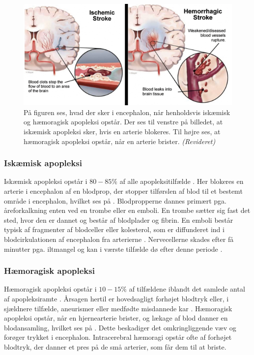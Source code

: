 \begin{figure}[H]
	\centering
	\includegraphics[scale=0.8]{figures/bProblemanalyse/haemoragisk_og_iskaemisk.png}
	\caption{På figuren ses, hvad der sker i encephalon, når henholdsvis iskæmisk og hæmoragisk apopleksi opstår. Der ses til venstre på billedet, at iskæmisk apopleksi sker, hvis en arterie blokeres. Til højre ses, at hæmoragisk apopleksi opstår, når en arterie brister. \textit{(Revideret)} \cite{Ritter2015}}
	\label{haem-isk}
\end{figure}

\subsubsection{Iskæmisk apopleksi}\label{IskaemiskApp}
Iskæmisk apopleksi opstår i $80-85\%$ af alle apopleksitilfælde \cite{Sundhed.dk2014}. Her blokeres en arterie i encephalon af en blodprop, der stopper tilførslen af blod til et bestemt område i encephalon, hvilket ses på . Blodpropperne dannes primært pga. åreforkalkning enten ved en trombe eller en emboli. En trombe sætter sig fast det sted, hvor den er dannet og består af blodplader og fibrin. \cite{Schulze2011} En emboli består typisk af fragmenter af blodceller eller kolesterol, som er diffunderet ind i blodcirkulationen af encephalon fra arterierne \cite{Academic2015a}. Nervecellerne skades efter få minutter pga. iltmangel og kan i værste tilfælde dø efter denne periode \cite{Schulze2011,Giraldo2015}.%

\subsubsection{Hæmoragisk apopleksi}
Hæmoragisk apopleksi opstår i $10-15\%$ af tilfældene iblandt det samlede antal af apopleksiramte \cite{Sundhed.dk2014}. Årsagen hertil er hovedsagligt forhøjet blodtryk eller, i sjældnere tilfælde, aneurismer eller medfødte misdannede kar \cite{Schulze2011}. Hæmoragisk apopleksi opstår, når en hjernearterie brister, og lækage af blod danner en blodansamling, hvilket ses på . Dette beskadiger det omkringliggende væv og forøger trykket i encephalon. Intracerebral hæmoragi opstår ofte af forhøjet blodtryk, der danner et pres på de små arterier, som får dem til at briste. \cite{Caplan2006}

